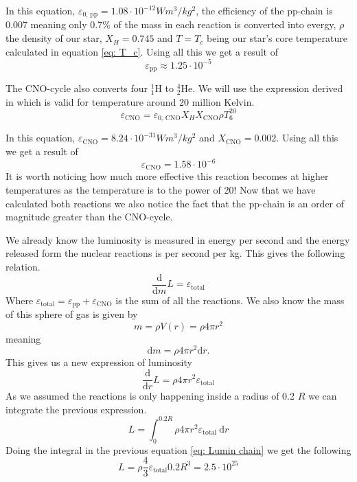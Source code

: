 \documentclass[reprint,english,notitlepage]{revtex4-2}
\begin{document}
In this equation, $ ε_{\text{0, pp}} = 1.08 ⋅ 10^{-12}Wm^{3} / kg^{2} $, the efficiency of the pp-chain is 0.007 meaning only 0.7\% of the mass in each reaction is converted into evergy, $ ρ $ the density of our star, $ X_{H} = 0.745$ and $ T = T_c $ being our star's core temperature calculated in equation \ref{eq: T_c}. Using all this we get a result of 
\begin{equation}\label{eq: E_pp}
  ε_{\text{pp}} ≈ 1.25 ⋅ 10^{-5}
\end{equation}

The CNO-cycle also converts four $ _{1}^{1}\text{H} $ to $ _{2}^{4}\text{He} $.
We will use the expression derived in%
which is valid for temperature around 20 million Kelvin.
\begin{equation}\label{eq: CNO-cycle}
  ε_{\text{CNO}} = ε_{\text{0, CNO}}X_{H}X_{\text{CNO}}ρT^{20}_{6}
\end{equation}\newline

In this equation, $ ε_{\text{CNO}} = 8.24 ⋅ 10^{-31}Wm^{3} / kg^{2} $ and $ X_{\text{CNO}} = 0.002 $. Using all this we get a result of 
\begin{equation}\label{eq: E_CNO}
  ε_{\text{CNO}} = 1.58 ⋅ 10^{-6}
\end{equation}
It is worth noticing how much more effective this reaction becomes at higher temperatures as the temperature is to the power of 20! Now that we have calculated both reactions we also notice the fact that the pp-chain is an order of magnitude greater than the CNO-cycle. 

We already know the luminosity is measured in energy per second and the energy released form the nuclear reactions is per second per kg. This gives the following relation. 
\begin{equation}\label{}
  \frac{\mathrm{d}}{\mathrm{d}m} L= ε_{\text{total}}
\end{equation}
Where $ ε_{\text{total}} = ε_{\text{pp}} + ε_{\text{CNO}} $ is the sum of all the reactions. We also know the mass of this sphere of gas is given by 
\[
m = ρV(r) = ρ 4 π r^{2}
\]
meaning 
\[
\mathrm{d}m = ρ 4 π r^{2}\mathrm{d}r. 
\]
This gives us a new expression of luminosity
\begin{equation}\label{}
  \frac{\mathrm{d}}{\mathrm{d}r} L = ρ4 π r^{2} ε_{\text{total}}
\end{equation}
As we assumed the reactions is only happening inside a radius of 0.2 $ R $ we can integrate the previous expression. 
\begin{equation}\label{eq: Lumin chain}
  L = \int_{0}^{0.2R } ρ4 π r^{2} ε_{\text{total}}\ \mathrm{d}r 
\end{equation}
Doing the integral in the previous equation \ref{eq: Lumin chain} we get the following
\begin{equation}\label{eq: Lumin chain final }
  L = ρ \frac{4}{3} ε_{\text{total}} 0.2R^{3} = 2.5 ⋅ 10^{25}
\end{equation}
\end{document}
